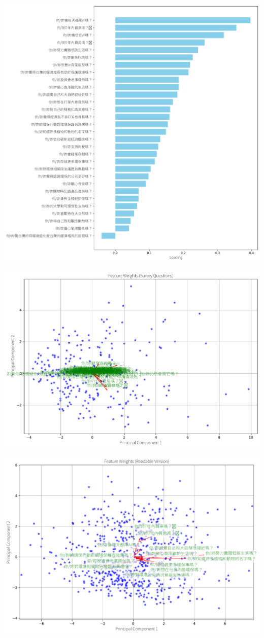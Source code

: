 \documentclass[
  letterpaper,
  DIV=11,
  numbers=noendperiod]{scrartcl}
\begin{document}
\includegraphics{_thesis_files/figure-pdf/cell-25-output-2.pdf}

\includegraphics{_thesis_files/figure-pdf/cell-25-output-3.pdf}

\includegraphics{_thesis_files/figure-pdf/cell-25-output-4.pdf}
\end{document}
